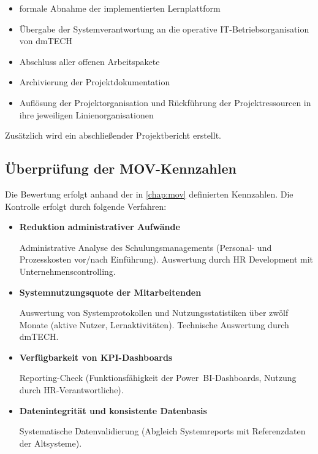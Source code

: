 \begin{itemize}

    \item formale Abnahme der implementierten Lernplattform

    \item Übergabe der Systemverantwortung an die operative
          \ac{IT}-Betriebsorganisation von \acs{dmTECH}

    \item Abschluss aller offenen Arbeitspakete

    \item Archivierung der Projektdokumentation

    \item Auflösung der Projektorganisation und Rückführung der
          Projektressourcen in ihre jeweiligen Linienorganisationen

\end{itemize}

Zusätzlich wird ein abschließender Projektbericht erstellt.

\subsection{Überprüfung der \ac{MOV}-Kennzahlen}

Die Bewertung erfolgt anhand der in \autoref{chap:mov} definierten Kennzahlen. Die Kontrolle erfolgt durch folgende Verfahren:

\begin{itemize}

    \item \textbf{Reduktion administrativer Aufwände}

          Administrative Analyse des Schulungsmanagements (Personal- und Prozesskosten vor/nach Einführung). Auswertung durch \ac{HR} Development mit Unternehmenscontrolling.

    \item \textbf{Systemnutzungsquote der Mitarbeitenden}

          Auswertung von Systemprotokollen und Nutzungsstatistiken über zwölf Monate (aktive Nutzer, Lernaktivitäten). Technische Auswertung durch \acs{dmTECH}.

    \item \textbf{Verfügbarkeit von \ac{KPI}-Dashboards}

          Reporting-Check (Funktionsfähigkeit der Power~BI-Dashboards, Nutzung durch \ac{HR}-Verantwortliche).

    \item \textbf{Datenintegrität und konsistente Datenbasis}

          Systematische Datenvalidierung (Abgleich Systemreports mit Referenzdaten der Altsysteme).

\end{itemize}

